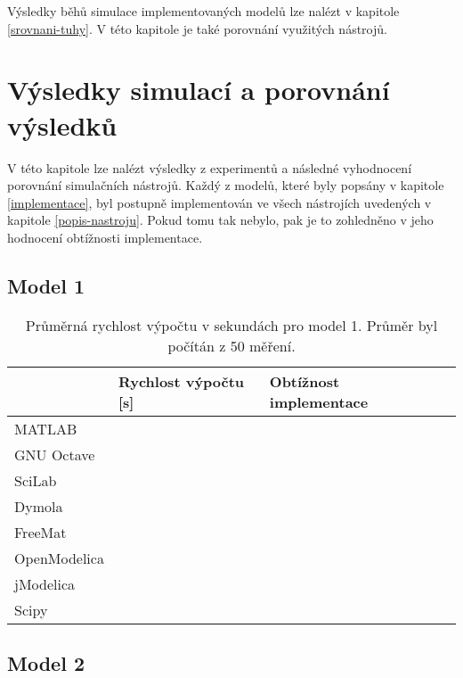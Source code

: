 Výsledky běhů simulace implementovaných modelů lze nalézt v kapitole \ref{srovnani-tuhy}. V této kapitole je také porovnání využitých nástrojů.

\chapter{Výsledky simulací a porovnání výsledků}
\label{kapitola5}
V této kapitole lze nalézt výsledky z experimentů a následné vyhodnocení porovnání simulačních nástrojů. Každý z modelů, které byly popsány v kapitole \ref{implementace}, byl postupně implementován ve všech nástrojích uvedených v kapitole \ref{popis-nastroju}. Pokud tomu tak nebylo, pak je to zohledněno v jeho hodnocení obtížnosti implementace.

\section{Model 1}
\label{srovnani-micek}


\begin{table}[ht]
\centering
\begin{tabular}{|l|l|l|l|}
\hline
             & Rychlost výpočtu {[}s{]} & Obtížnost implementace &  \\ \hline
MATLAB       &                          &  &  \\ \hline
GNU Octave   &                          &  &  \\ \hline
SciLab       &                          &  &  \\ \hline
Dymola       &                          &  &  \\ \hline
FreeMat &                          &  &  \\ \hline
OpenModelica    &                          &  &  \\ \hline
jModelica        &                          &  &  \\ \hline
Scipy           &                          &  &  \\ \hline
\end{tabular}
\caption{Průměrná rychlost výpočtu v sekundách pro model 1. Průměr byl počítán z 50 měření.}
\label{tab:micek-tabulka}
\end{table}

\section{Model 2}
\label{srovnani-kruh}


